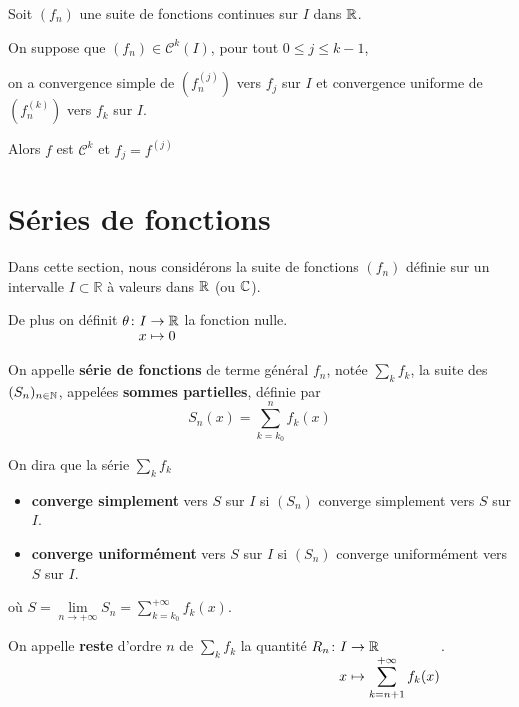 \documentclass[a4paper,12pt]{article}
\begin{document}
\begin{proposition}{}{}
    Soit $(f_n)$ une suite de fonctions continues sur $I$ dans $\mathbb{R}$.

    On suppose que $(f_n) \in \mathcal{C}^k(I)$, pour tout $0 \leq j \leq k - 1$,

    on a convergence simple de $(f_n^{(j)})$ vers $f_j$ sur $I$ et convergence uniforme de $(f_n^{(k)})$ vers $f_k$ sur $I$.

    Alors $f$ est $\mathcal{C}^k$ et $f_j = f^{(j)}$
\end{proposition}

\clearpage

\section{Séries de fonctions}

Dans cette section, nous considérons la suite de fonctions $(f_n)$ définie sur un intervalle $I \subset \mathbb{R}$ à valeurs dans $\mathbb{R}$ (ou $\mathbb{C}$).

De plus on définit $\funcdef{\theta}{I}{\R}{x}{0}$ la fonction nulle.

\begin{definition}
    On appelle \textbf{série de fonctions} de terme général $f_n$, notée $\sum\limits_k f_k$, la suite des $(S_n)_{n \in \mathbb{N}}$, appelées \textbf{sommes partielles}, définie par
    $$
    S_n(x) = \sum_{k=k_0}^n f_k(x)
    $$
\end{definition}

\begin{definition}
    On dira que la série $\sum\limits_k f_k$ 
    \begin{itemize}[label=--]
        \item 
        \textbf{converge simplement} vers $S$ sur $I$ si $(S_n)$ converge simplement vers $S$ sur $I$.
        \item 
        \textbf{converge uniformément} vers $S$ sur $I$ si $(S_n)$ converge uniformément vers $S$ sur $I$.
    \end{itemize}
    où $S = \lim\limits_{n \to +\infty} S_n = \sum\limits_{k=k_0}^{+\infty} f_k(x)$.

    On appelle \textbf{reste} d'ordre $n$ de $\sum\limits_k f_k$ la quantité $\funcdef{R_n}{I}{\R}{x}{\sum_{k=n+1}^{+\infty} f_k(x)}$.
\end{definition}
\end{document}
